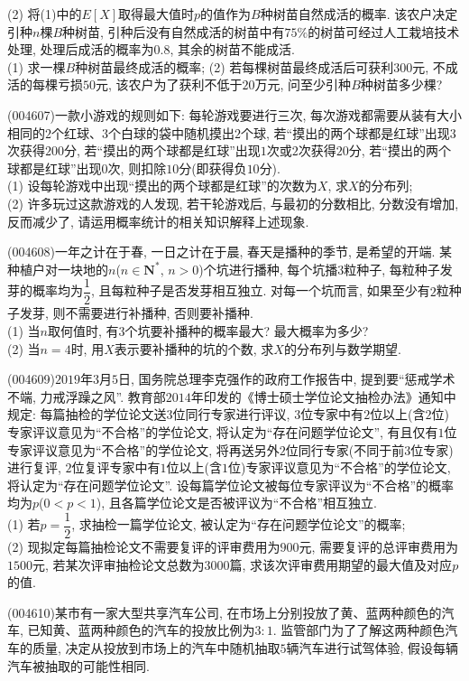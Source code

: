 (2) 将(1)中的$E[X]$取得最大值时$p$的值作为$B$种树苗自然成活的概率. 该农户决定引种$n$棵$B$种树苗, 引种后没有自然成活的树苗中有$75\%$的树苗可经过人工栽培技术处理, 处理后成活的概率为$0.8$, 其余的树苗不能成活.\\
(1) 求一棵$B$种树苗最终成活的概率;
(2) 若每棵树苗最终成活后可获利$300$元, 不成活的每棵亏损$50$元, 该农户为了获利不低于$20$万元, 问至少引种$B$种树苗多少棵?
\item (004607)一款小游戏的规则如下: 每轮游戏要进行三次, 每次游戏都需要从装有大小相同的$2$个红球、$3$个白球的袋中随机摸出$2$个球, 若``摸出的两个球都是红球''出现$3$次获得$200$分, 若``摸出的两个球都是红球''出现$1$次或$2$次获得$20$分, 若``摸出的两个球都是红球''出现$0$次, 则扣除$10$分(即获得负$10$分).\\
(1) 设每轮游戏中出现``摸出的两个球都是红球''的次数为$X$, 求$X$的分布列;\\
(2) 许多玩过这款游戏的人发现, 若干轮游戏后, 与最初的分数相比, 分数没有增加, 反而减少了, 请运用概率统计的相关知识解释上述现象.
\item (004608)一年之计在于春, 一日之计在于晨, 春天是播种的季节, 是希望的开端. 某种植户对一块地的$n$($n\in \mathbf{N}^*$, $n>0$)个坑进行播种, 每个坑播$3$粒种子, 每粒种子发芽的概率均为$\dfrac 12$, 且每粒种子是否发芽相互独立. 对每一个坑而言, 如果至少有$2$粒种子发芽, 则不需要进行补播种, 否则要补播种.\\
(1) 当$n$取何值时, 有$3$个坑要补播种的概率最大? 最大概率为多少?\\
(2) 当$n=4$时, 用$X$表示要补播种的坑的个数, 求$X$的分布列与数学期望.
\item (004609)$2019$年$3$月$5$日, 国务院总理李克强作的政府工作报告中, 提到要``惩戒学术不端, 力戒浮躁之风''. 教育部$2014$年印发的《博士硕士学位论文抽检办法》通知中规定: 每篇抽检的学位论文送$3$位同行专家进行评议, $3$位专家中有$2$位以上(含$2$位)专家评议意见为``不合格''的学位论文, 将认定为``存在问题学位论文'', 有且仅有$1$位专家评议意见为``不合格''的学位论文, 将再送另外$2$位同行专家(不同于前$3$位专家)进行复评, $2$位复评专家中有$1$位以上(含$1$位)专家评议意见为``不合格''的学位论文, 将认定为``存在问题学位论文''. 设每篇学位论文被每位专家评议为``不合格''的概率均为$p$($0<p<1$), 且各篇学位论文是否被评议为``不合格''相互独立.\\
(1) 若$p=\dfrac 12$, 求抽检一篇学位论文, 被认定为``存在问题学位论文''的概率;\\
(2) 现拟定每篇抽检论文不需要复评的评审费用为$900$元, 需要复评的总评审费用为$1500$元, 若某次评审抽检论文总数为$3000$篇, 求该次评审费用期望的最大值及对应$p$的值.
\item (004610)某市有一家大型共享汽车公司, 在市场上分别投放了黄、蓝两种颜色的汽车, 已知黄、蓝两种颜色的汽车的投放比例为$3:1$. 监管部门为了了解这两种颜色汽车的质量, 决定从投放到市场上的汽车中随机抽取$5$辆汽车进行试驾体验, 假设每辆汽车被抽取的可能性相同.\\

